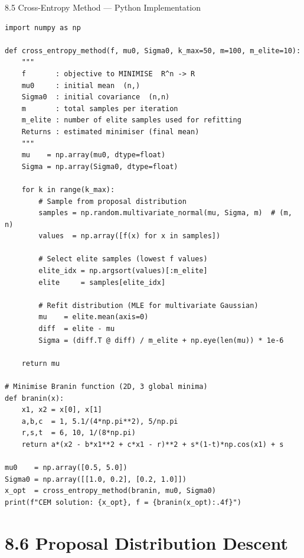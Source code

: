 \documentclass[aspectratio=169,10pt]{beamer}
\begin{document}
\begin{frame}[fragile]{8.5 Cross-Entropy Method --- Python Implementation}
\begin{lstlisting}[caption={Cross-entropy method with Gaussian proposal (Algorithm 8.8)}]
import numpy as np

def cross_entropy_method(f, mu0, Sigma0, k_max=50, m=100, m_elite=10):
    """
    f       : objective to MINIMISE  R^n -> R
    mu0     : initial mean  (n,)
    Sigma0  : initial covariance  (n,n)
    m       : total samples per iteration
    m_elite : number of elite samples used for refitting
    Returns : estimated minimiser (final mean)
    """
    mu    = np.array(mu0, dtype=float)
    Sigma = np.array(Sigma0, dtype=float)

    for k in range(k_max):
        # Sample from proposal distribution
        samples = np.random.multivariate_normal(mu, Sigma, m)  # (m, n)
        values  = np.array([f(x) for x in samples])

        # Select elite samples (lowest f values)
        elite_idx = np.argsort(values)[:m_elite]
        elite     = samples[elite_idx]

        # Refit distribution (MLE for multivariate Gaussian)
        mu    = elite.mean(axis=0)
        diff  = elite - mu
        Sigma = (diff.T @ diff) / m_elite + np.eye(len(mu)) * 1e-6

    return mu

# Minimise Branin function (2D, 3 global minima)
def branin(x):
    x1, x2 = x[0], x[1]
    a,b,c  = 1, 5.1/(4*np.pi**2), 5/np.pi
    r,s,t  = 6, 10, 1/(8*np.pi)
    return a*(x2 - b*x1**2 + c*x1 - r)**2 + s*(1-t)*np.cos(x1) + s

mu0    = np.array([0.5, 5.0])
Sigma0 = np.array([[1.0, 0.2], [0.2, 1.0]])
x_opt  = cross_entropy_method(branin, mu0, Sigma0)
print(f"CEM solution: {x_opt}, f = {branin(x_opt):.4f}")
\end{lstlisting}
\end{frame}

\section{8.6 Proposal Distribution Descent}
\end{document}
